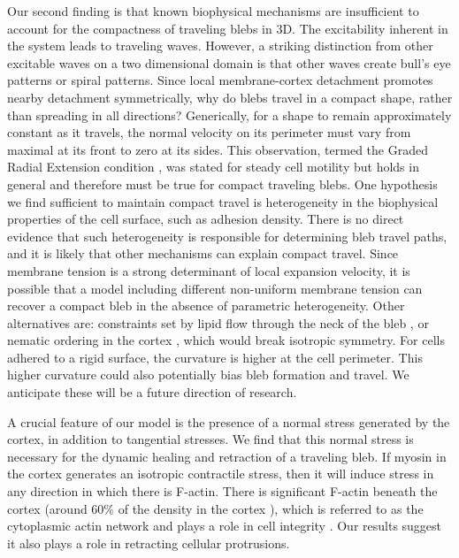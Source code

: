 Our second finding is that known biophysical mechanisms are insufficient to account for the compactness of traveling blebs in 3D. The excitability inherent in the system leads to traveling waves. However, a striking distinction from other excitable waves on a two dimensional domain is that other waves create bull's eye patterns or spiral patterns. Since local membrane-cortex detachment promotes nearby detachment symmetrically, why do blebs travel in a compact shape, rather than spreading in all directions? Generically, for a shape to remain approximately constant as it travels, the normal velocity on its perimeter must vary from maximal at its front to zero at its sides. This observation, termed the Graded Radial Extension condition \cite{Lee:1993bt}, was stated for steady cell motility but holds in general and therefore must be true for compact traveling blebs. One hypothesis we find sufficient to maintain compact travel is heterogeneity in the biophysical properties of the cell surface, such as adhesion density. There is no direct evidence that such heterogeneity is responsible for determining bleb travel paths, and it is likely that other mechanisms can explain compact travel. Since membrane tension is a strong determinant of local expansion velocity, it is possible that a model including different non-uniform membrane tension can recover a compact bleb in the absence of parametric heterogeneity. Other alternatives are: constraints set by lipid flow through the neck of the bleb \cite{Rangamani:2013ce}, or nematic ordering in the cortex \cite{Kapustina:2013gc}, which would break isotropic symmetry. For cells adhered to a rigid surface, the curvature is higher at the cell perimeter. This higher curvature could also potentially bias bleb formation and travel. We anticipate these will be a future direction of research. 



{\color{blue}
A crucial feature of our model is the presence of a normal stress generated by the cortex, in addition to tangential stresses. We find that this normal stress is necessary for the dynamic healing and retraction of a traveling bleb. If myosin in the cortex generates an isotropic contractile stress, then it will induce stress in any direction in which there is F-actin. There is significant F-actin beneath the cortex (around 60\% of the density in the cortex \cite{Moeendarbary:2013bs,Clark:2013ef}), which is referred to as the cytoplasmic actin network and plays a role in cell integrity \cite{Luo:2013}. Our results suggest it also plays a role in retracting cellular protrusions.
}

